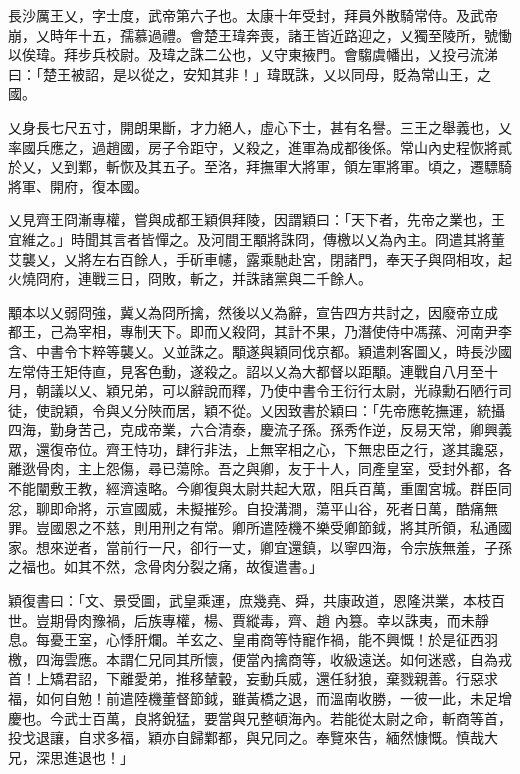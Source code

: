 \begin{pinyinscope}
 長沙厲王乂，字士度，武帝第六子也。太康十年受封，拜員外散騎常侍。及武帝崩，乂時年十五，孺慕過禮。會楚王瑋奔喪，諸王皆近路迎之，乂獨至陵所，號慟以俟瑋。拜步兵校尉。及瑋之誅二公也，乂守東掖門。會騶虞幡出，乂投弓流涕曰：「楚王被詔，是以從之，安知其非！」瑋既誅，乂以同母，貶為常山王，之國。



 乂身長七尺五寸，開朗果斷，才力絕人，虛心下士，甚有名譽。三王之舉義也，乂
 率國兵應之，過趙國，房子令距守，乂殺之，進軍為成都後係。常山內史程恢將貳於乂，乂到鄴，斬恢及其五子。至洛，拜撫軍大將軍，領左軍將軍。頃之，遷驃騎將軍、開府，復本國。



 乂見齊王冏漸專權，嘗與成都王穎俱拜陵，因謂穎曰：「天下者，先帝之業也，王宜維之。」時聞其言者皆憚之。及河間王顒將誅冏，傳檄以乂為內主。冏遣其將董艾襲乂，乂將左右百餘人，手斫車幰，露乘馳赴宮，閉諸門，奉天子與冏相攻，起火燒冏府，連戰三日，冏敗，斬之，并誅諸黨與二千餘人。



 顒本以乂弱冏強，冀乂為冏所擒，然後以乂為辭，宣告四方共討之，因廢帝立成
 都王，己為宰相，專制天下。即而乂殺冏，其計不果，乃潛使侍中馮蓀、河南尹李含、中書令卞粹等襲乂。乂並誅之。顒遂與穎同伐京都。穎遣刺客圖乂，時長沙國左常侍王矩侍直，見客色動，遂殺之。詔以乂為大都督以距顒。連戰自八月至十月，朝議以乂、穎兄弟，可以辭說而釋，乃使中書令王衍行太尉，光祿勳石陋行司徒，使說穎，令與乂分陜而居，穎不從。乂因致書於穎曰：「先帝應乾撫運，統攝四海，勤身苦己，克成帝業，六合清泰，慶流子孫。孫秀作逆，反易天常，卿興義眾，還復帝位。齊王恃功，肆行非法，上無宰相之心，下無忠臣之行，遂其讒惡，
 離逖骨肉，主上怨傷，尋已蕩除。吾之與卿，友于十人，同產皇室，受封外都，各不能闡敷王教，經濟遠略。今卿復與太尉共起大眾，阻兵百萬，重圍宮城。群臣同忿，聊即命將，示宣國威，未擬摧殄。自投溝澗，蕩平山谷，死者日萬，酷痛無罪。豈國恩之不慈，則用刑之有常。卿所遣陸機不樂受卿節鉞，將其所領，私通國家。想來逆者，當前行一尺，卻行一丈，卿宜還鎮，以寧四海，令宗族無羞，子孫之福也。如其不然，念骨肉分裂之痛，故復遣書。」



 穎復書曰：「文、景受圖，武皇乘運，庶幾堯、舜，共康政道，恩隆洪業，本枝百世。豈期骨肉豫禍，后族專權，楊、賈縱毒，齊、趙
 內篡。幸以誅夷，而未靜息。每憂王室，心悸肝爛。羊玄之、皇甫商等恃寵作禍，能不興慨！於是征西羽檄，四海雲應。本謂仁兄同其所懷，便當內擒商等，收級遠送。如何迷惑，自為戎首！上矯君詔，下離愛弟，推移輦轂，妄動兵威，還任豺狼，棄戮親善。行惡求福，如何自勉！前遣陸機董督節鉞，雖黃橋之退，而溫南收勝，一彼一此，未足增慶也。今武士百萬，良將銳猛，要當與兄整頓海內。若能從太尉之命，斬商等首，投戈退讓，自求多福，穎亦自歸鄴都，與兄同之。奉覽來告，緬然慷慨。慎哉大兄，深思進退也！」




\end{pinyinscope}
